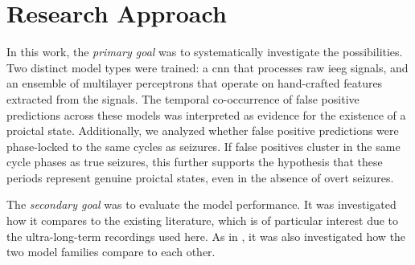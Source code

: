 \section{Research Approach}
In this work, the \textit{primary goal} was to systematically investigate the possibilities.
Two distinct model types were trained: a \gls{cnn} that processes raw \gls{ieeg} signals, and an ensemble of multilayer perceptrons that operate on hand-crafted features extracted from the signals.
The temporal co-occurrence of false positive predictions across these models was interpreted as evidence for the existence of a proictal state.
Additionally, we analyzed whether false positive predictions were phase-locked to the same cycles as seizures.
If false positives cluster in the same cycle phases as true seizures, this further supports the hypothesis that these periods represent genuine proictal states, even in the absence of overt seizures.

The \textit{secondary goal} was to evaluate the model performance.
It was investigated how it compares to the existing literature, which is of particular interest due to the ultra-long-term recordings used here.
As in \textcite{muller_coherent_2022}, it was also investigated how the two model families compare to each other.
